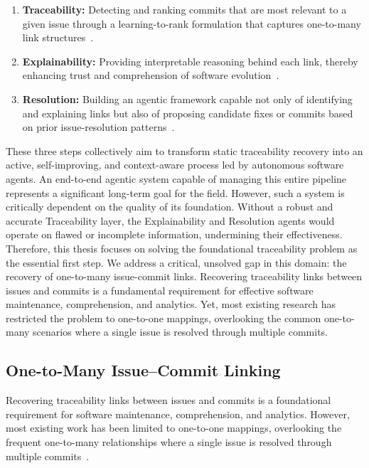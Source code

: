 \begin{enumerate}
    \item \textbf{Traceability:} Detecting and ranking commits that are most relevant to a given issue through a learning-to-rank formulation that captures one-to-many link structures~\cite{r11,r7,r17}.
    \item \textbf{Explainability:} Providing interpretable reasoning behind each link, thereby enhancing trust and comprehension of software evolution~\cite{r45,r72}.
    \item \textbf{Resolution:} Building an agentic framework capable not only of identifying and explaining links but also of proposing candidate fixes or commits based on prior issue-resolution patterns~\cite{r89,r94}.
\end{enumerate}

These three steps collectively aim to transform static traceability recovery into an active, self-improving, and context-aware process led by autonomous software agents. An end-to-end agentic system capable of managing this entire pipeline represents a significant long-term goal for the field. However, such a system is critically dependent on the quality of its foundation. Without a robust and accurate Traceability layer, the Explainability and Resolution agents would operate on flawed or incomplete information, undermining their effectiveness.\\

Therefore, this thesis focuses on solving the foundational traceability problem as the essential first step. We address a critical, unsolved gap in this domain: the recovery of one-to-many issue-commit links. Recovering traceability links between issues and commits is a fundamental requirement for effective software maintenance, comprehension, and analytics. Yet, most existing research has restricted the problem to one-to-one mappings, overlooking the common one-to-many scenarios where a single issue is resolved through multiple commits.

\subsection{One-to-Many Issue–Commit Linking}

Recovering traceability links between issues and commits is a foundational requirement for software maintenance, comprehension, and analytics. However, most existing work has been limited to one-to-one mappings, overlooking the frequent one-to-many relationships where a single issue is resolved through multiple commits~\cite{r11,r17,r21}.


